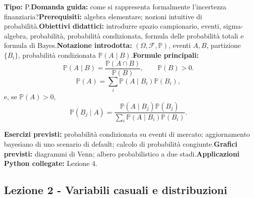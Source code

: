 \documentclass[12pt,a4paper]{article}%
\newcommand{\1}{\mathbf{1}}
\begin{document}
\textbf{Tipo:} P.\newline\textbf{Domanda guida:} come si rappresenta
formalmente l'incertezza finanziaria?\newline\textbf{Prerequisiti:} algebra
elementare; nozioni intuitive di probabilit\`{a}.\newline\textbf{Obiettivi
didattici:} introdurre spazio campionario, eventi, sigma-algebra,
probabilit\`{a}, probabilit\`{a} condizionata, formula delle probabilit\`{a}
totali e formula di Bayes.\newline\textbf{Notazione introdotta:}
$(\Omega,\mathcal{F},\mathbb{P})$, eventi $A,B$, partizione $\{B_{i}\}$,
probabilit\`{a} condizionata $\mathbb{P}(A\mid B)$.\newline\textbf{Formule
principali:}
\[
\mathbb{P}(A\mid B)=\frac{\mathbb{P}(A\cap B)}{\mathbb{P}(B)},\qquad
\mathbb{P}(B)>0.
\]
\[
\mathbb{P}(A)=\sum_{i} \mathbb{P}(A\mid B_{i})\mathbb{P}(B_{i}),
\]
e, se $\mathbb{P}(A)>0$,
\[
\mathbb{P}(B_{j}\mid A)=
\frac{\mathbb{P}(A\mid B_{j})\mathbb{P}(B_{j})}
{\sum_{i} \mathbb{P}(A\mid B_{i})\mathbb{P}(B_{i})}.
\]

\textbf{Esercizi previsti:} probabilit\`{a} condizionata su eventi di mercato;
aggiornamento bayesiano di uno scenario di default; calcolo di probabilit\`{a}
congiunte.\newline\textbf{Grafici previsti:} diagrammi di Venn; albero
probabilistico a due stadi.\newline\textbf{Applicazioni Python collegate:}
Lezione 4.

\subsection{Lezione 2 - Variabili casuali e distribuzioni}
\end{document}
